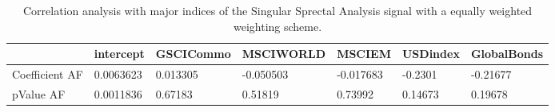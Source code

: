\begin{table}[H]
\centering
\begin{tabular}{lllllll}
\hline& intercept & GSCICommo & MSCIWORLD & MSCIEM & USDindex & GlobalBonds \\ 
\hline 
Coefficient AF & 0.0063623 & 0.013305 & -0.050503 & -0.017683 & -0.2301 & -0.21677 \\ 
pValue AF & 0.0011836 & 0.67183 & 0.51819 & 0.73992 & 0.14673 & 0.19678 \\ 
\hline
\end{tabular}
\caption{Correlation analysis with major indices of the Singular Sprectal Analysis signal with a equally weighted weighting scheme.}
\label{SSA_EW_AFACTOR}
\end{table}